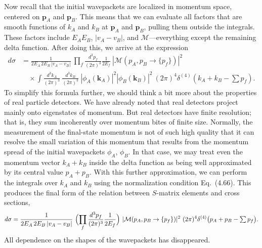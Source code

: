 Now recall that the initial wavepackets are localized in momentum space,
centered on $\mathbf{p}_A$ and $\mathbf{p}_B$.  This means that we can
evaluate all factors that are smooth functions of $k_A$ and $k_B$ at
$\mathbf{p}_A$ and $\mathbf{p}_B$, pulling them outside the integrals.  These
factors include $E_AE_B$, $|v_A-v_B|$, and $\mathcal{M}$---everything except
the remaining delta function.  After doing this, we arrive at the expression
\begin{equation}
  \begin{aligned}
    d\sigma &= \frac{1}{2E_A\,2E_B\,|v_A-v_B|}\
      \prod_f \frac{d^3p_f}{(2\pi)^3}\frac{1}{2E_f}\
      |\mathcal{M}(p_A,p_B\to\{p_f\})|^2\\
    &\quad \times \int \frac{d^3k_A}{(2\pi)^3}\ \frac{d^3k_B}{(2\pi)^3}\
      |\phi_A(\mathbf{k}_A)|^2|\phi_B(\mathbf{k}_B)|^2\
      (2\pi)^4\delta^{(4)}(k_A+k_B-\textstyle\sum p_f) .
  \end{aligned}
  \label{eq:4.78}
\end{equation}
To simplify this formula further, we should think a bit more about the
properties of real particle detectors.  We have already noted that real
detectors project mainly onto eigenstates of momentum.  But real detectors
have finite resolution; that is, they sum incoherently over momentum bites of
finite size.  Normally, the measurement of the final-state momentum is not of
such high quality that it can resolve the small variation of this momentum
that results from the momentum spread of the initial wavepackets
$\phi_A$, $\phi_B$.  In that case, we may treat even the momentum vector
$k_A+k_B$ inside the delta function as being well approximated by its central
value $p_A+p_B$.  With this further approximation, we can perform the
integrals over $k_A$ and $k_B$ using the normalization condition
Eq.~(4.66).  This produces the final form of the relation between
$S$-matrix elements and cross sections,
\begin{equation}
  d\sigma = \frac{1}{2E_A\,2E_B\,|v_A-v_B|}\
    \Bigl( \prod_f \frac{d^3p_f}{(2\pi)^3}\frac{1}{2E_f} \Bigr)\
    |\mathcal{M}(p_A,p_B\to\{p_f\})|^2\
    (2\pi)^4\delta^{(4)}\bigl( p_A+p_B-\textstyle\sum p_f \bigr) .
  \label{eq:4.79}
\end{equation}
All dependence on the shapes of the wavepackets has disappeared.

